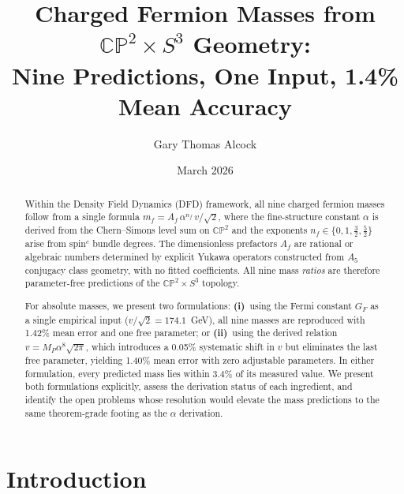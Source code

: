 \documentclass[11pt,a4paper]{article}
\newcommand{\CP}{\mathbb{CP}}
\theoremstyle{definition}
\theoremstyle{remark}
\begin{document}
\title{Charged Fermion Masses from $\CP^2\times S^3$ Geometry:\\
Nine Predictions, One Input, 1.4\% Mean Accuracy}

\author{Gary Thomas Alcock}

\date{March 2026}

\maketitle


\begin{abstract}
Within the Density Field Dynamics (DFD) framework, all nine charged
fermion masses follow from a single formula
$m_f = A_f\,\alpha^{n_f}\,v/\!\sqrt{2}$,
where the fine-structure constant $\alpha$ is derived from the
Chern--Simons level sum on $\CP^2$ and the exponents $n_f\in\{0,1,\tfrac{3}{2},\tfrac{5}{2}\}$
arise from spin$^c$ bundle degrees.
The dimensionless prefactors $A_f$ are rational or algebraic numbers
determined by explicit Yukawa operators constructed from $A_5$ conjugacy
class geometry, with no fitted coefficients.
All nine mass \emph{ratios} are therefore parameter-free predictions
of the $\CP^2\times S^3$ topology.

For absolute masses, we present two formulations:
\textbf{(i)}~using the Fermi constant $G_F$ as a single
empirical input ($v/\!\sqrt{2} = 174.1$~GeV), all nine masses are
reproduced with 1.42\% mean error and one free parameter; or
\textbf{(ii)}~using the derived relation $v = M_P\alpha^8\sqrt{2\pi}$,
which introduces a 0.05\% systematic shift in $v$ but eliminates
the last free parameter, yielding 1.40\% mean error with zero
adjustable parameters.
In either formulation, every predicted mass lies within 3.4\%
of its measured value.
We present both formulations explicitly, assess the derivation
status of each ingredient, and identify the open problems whose
resolution would elevate the mass predictions to the same
theorem-grade footing as the $\alpha$ derivation.
\end{abstract}

\section{Introduction}
\label{sec:intro}
\end{document}
